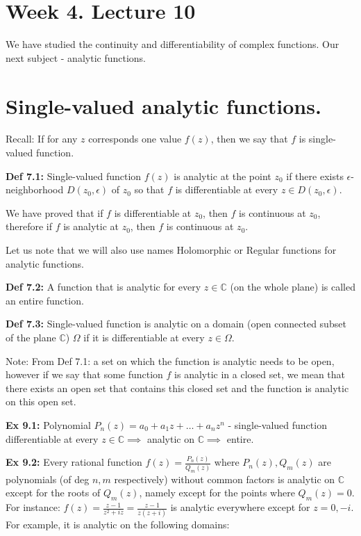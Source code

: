 \documentclass{article}
\begin{document}
\section*{Week 4. Lecture 10}

We have studied the continuity and differentiability of complex functions. Our next subject - analytic functions.

\section{Single-valued analytic functions.}

Recall: If for any $z$ corresponds one value $f(z)$, then we say that $f$ is single-valued function.

\textbf{Def 7.1:} Single-valued function $f(z)$ is analytic at the point $z_0$ if there exists $\epsilon$-neighborhood $D(z_0, \epsilon)$ of $z_0$ so that $f$ is differentiable at every $z \in D(z_0, \epsilon)$.

We have proved that if $f$ is differentiable at $z_0$, then $f$ is continuous at $z_0$, therefore if $f$ is analytic at $z_0$, then $f$ is continuous at $z_0$.

Let us note that we will also use names Holomorphic or Regular functions for analytic functions.

\textbf{Def 7.2:} A function that is analytic for every $z \in \mathbb{C}$ (on the whole plane) is called an entire function.

\textbf{Def 7.3:} Single-valued function is analytic on a domain (open connected subset of the plane $\mathbb{C}$) $\Omega$ if it is differentiable at every $z \in \Omega$.

Note: From Def 7.1: a set on which the function is analytic needs to be open, however if we say that some function $f$ is analytic in a closed set, we mean that there exists an open set that contains this closed set and the function is analytic on this open set.

\textbf{Ex 9.1:} Polynomial $P_n(z) = a_0 + a_1z + \dots + a_nz^n$ - single-valued function differentiable at every $z \in \mathbb{C} \implies$ analytic on $\mathbb{C} \implies$ entire.

\textbf{Ex 9.2:} Every rational function $f(z) = \frac{P_n(z)}{Q_m(z)}$ where $P_n(z), Q_m(z)$ are polynomials (of deg $n, m$ respectively) without common factors is analytic on $\mathbb{C}$ except for the roots of $Q_m(z)$, namely except for the points where $Q_m(z) = 0$. For instance: $f(z) = \frac{z-1}{z^2 + iz} = \frac{z-1}{z(z+i)}$ is analytic everywhere except for $z = 0, -i$. For example, it is analytic on the following domains:
\end{document}
